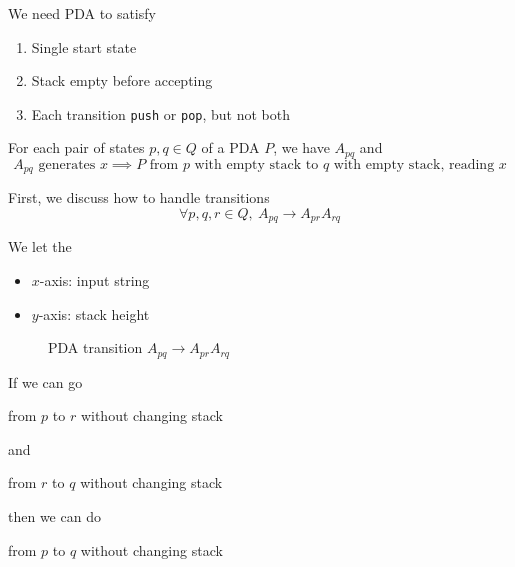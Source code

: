 \begin{note}
    We need PDA to satisfy
    \begin{enumerate}[label=$\arabic*^\circ$]
        \item Single start state
        \item Stack empty before accepting
        \item Each transition \texttt{push} or \texttt{pop}, but not both
    \end{enumerate}
\end{note}

\begin{idea}
    For each pair of states \(p, q \in Q\) of a PDA $P$, we have $A_{pq}$ and
    \[
        A_{pq} \text{ generates } x \implies P \text{ from } p \text{ with empty stack to } q \text{ with empty stack, reading } x 
    \]
\end{idea}

First, we discuss how to handle transitions
\[
    \forall p, q, r \in Q, \ A_{pq} \to A_{pr}A_{rq}
\]

We let the
\begin{itemize}
    \item $x$-axis: input string
    \item $y$-axis: stack height
\end{itemize}

\begin{figure}[H]
    \centering
    \caption{PDA transition $A_{pq} \to A_{pr}A_{rq}$}
\end{figure}

If we can go
\begin{center}
    from $p$ to $r$ without changing stack
\end{center}
and
\begin{center}
    from $r$ to $q$ without changing stack
\end{center}
then we can do
\begin{center}
    from $p$ to $q$ without changing stack
\end{center}

